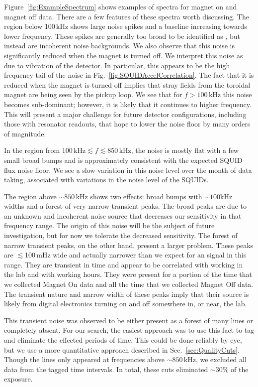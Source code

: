 \documentclass[aps,prd,amsmath,amssymb,reprint,superscriptaddress, nofootinbib,
]{revtex4-1}
\begin{document}
Figure~\ref{fig:ExampleSpectrum} shows examples of spectra for magnet on and magnet off data. There are a few features of these spectra worth discussing. The region below 100\,kHz shows large noise spikes and a baseline increasing towards lower frequency. These spikes are generally too broad to be identified as \ADM, but instead are incoherent noise backgrounds. We also observe that this noise is significantly reduced when the magnet is turned off. We interpret this noise as due to vibration of the detector. In particular, this appears to be the high frequency tail of the noise in Fig.~\ref{fig:SQUIDAccelCorrelation}. The fact that it is reduced when the magnet is turned off implies that stray fields from the toroidal magnet are being seen by the pickup loop. We see that for $f>100$\,kHz this noise becomes sub-dominant; however, it is likely that it continues to higher frequency. This will present a major challenge for future detector configurations, including those with resonator readouts, that hope to lower the noise floor by many orders of magnitude. 

In the region from $100\,\mathrm{kHz}\lesssim f\lesssim850\,\mathrm{kHz}$, the noise is mostly flat with a few small broad bumps and is approximately consistent with the expected SQUID flux noise floor. We see a slow variation in this noise level over the month of data taking, associated with variations in the noise level of the SQUIDs. 

The region above $\sim850$\,kHz shows two effects: broad bumps with $\sim100$kHz widths and a forest of very narrow transient peaks. The broad peaks are due to an unknown and incoherent noise source that decreases our sensitivity in that frequency range. The origin of this noise will be the subject of future investigation, but for now we tolerate the decreased sensitivity. The forest of narrow transient peaks, on the other hand, present a larger problem. These peaks are $\lesssim$100\,mHz wide and actually narrower than we expect for an \ADM signal in this range. They are transient in time and appear to be correlated with working in the lab and with working hours. They were present for a portion of the time that we collected Magnet On data and all the time that we collected Magnet Off data. The transient nature and narrow width of these peaks imply that their source is likely from digital electronics turning on and off somewhere in, or near, the lab.

This transient noise was observed to be either present as a forest of many lines or completely absent. For our \ADM search, the easiest approach was to use this fact to tag and eliminate the effected periods of time. This could be done reliably by eye, but we use a more quantitative approach described in Sec.~\ref{sec:QualityCuts}. Though the lines only appeared at frequencies above $\sim850$\,kHz, we excluded all data from the tagged time intervals. In total, these cuts eliminated $\sim$30\% of the exposure.
\end{document}
